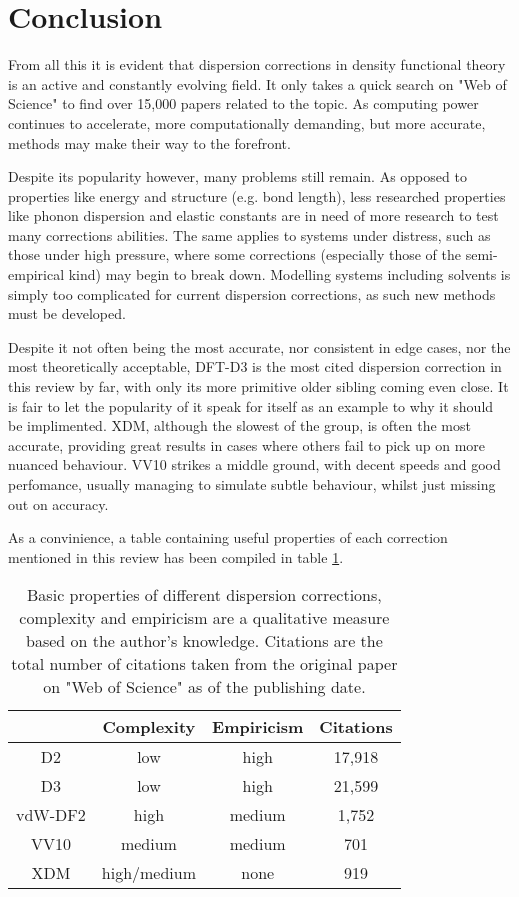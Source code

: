 \documentclass[10pt,a4paper,twocolumn,twoside]{extarticle}
\begin{document}
	\section{Conclusion}
	From all this it is evident that dispersion corrections in density functional theory is an active and constantly evolving field. It only takes a quick search on "Web of Science" to find over 15,000 papers related to the topic. As computing power continues to accelerate, more computationally demanding, but more accurate, methods may make their way to the forefront.

	Despite its popularity however, many problems still remain. As opposed to properties like energy and structure (e.g. bond length), less researched properties like phonon dispersion and elastic constants are in need of more research to test many corrections abilities. The same applies to systems under distress, such as those under high pressure, where some corrections (especially those of the semi-empirical kind) may begin to break down. Modelling systems including solvents is simply too complicated for current dispersion corrections, as such new methods must be developed. 

	Despite it not often being the most accurate, nor consistent in edge cases, nor the most theoretically acceptable, DFT-D3 is the most cited dispersion correction in this review by far, with only its more primitive older sibling coming even close. It is fair to let the popularity of it speak for itself as an example to why it should be implimented. XDM, although the slowest of the group, is often the most accurate, providing great results in cases where others fail to pick up on more nuanced behaviour. VV10 strikes a middle ground, with decent speeds and good perfomance, usually managing to simulate subtle behaviour, whilst just missing out on accuracy. 

	As a convinience, a table containing useful properties of each correction mentioned in this review has been compiled in table \ref{tab:conc}. 

	\begin{table}
		\begin{tabular}{c|c c c}
			& Complexity & Empiricism & Citations \\
			\hline
			D2 & low & high & 17,918\\
			D3 & low & high & 21,599\\
			vdW-DF2 & high & medium  & 1,752\\
			VV10 & medium & medium & 701\\
			XDM & high/medium & none & 919\\
		\end{tabular}
		\caption{Basic properties of different dispersion corrections, complexity and empiricism are a qualitative measure based on the author's knowledge. Citations are the total number of citations taken from the original paper on "Web of Science" as of the publishing date.}
		\label{tab:conc}
	\end{table}


	\newpage
	\printbibliography
	
\end{document}
